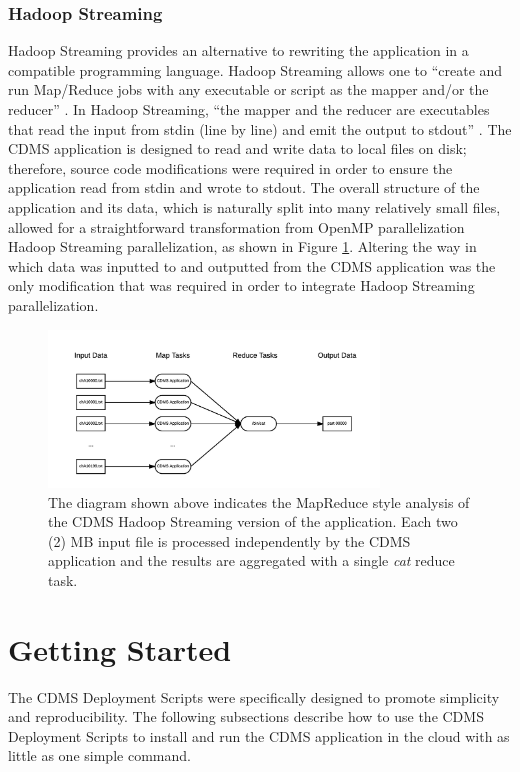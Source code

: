 \documentclass[9pt,twocolumn,twoside]{../../styles/osajnl}
\begin{document}
\subsubsection{Hadoop Streaming}
Hadoop Streaming provides an alternative to rewriting the application
in a compatible programming language. Hadoop Streaming allows one to
``create and run Map/Reduce jobs with any executable or script as the
mapper and/or the reducer'' \cite{www-hadoop-streaming}. In Hadoop
Streaming, ``the mapper and the reducer are executables that read the
input from stdin (line by line) and emit the output to stdout''
\cite{www-hadoop-streaming}. The CDMS application is designed to read
and write data to local files on disk; therefore, source code
modifications were required in order to ensure the application read
from stdin and wrote to stdout. The overall structure of the
application and its data, which is naturally split into many
relatively small files, allowed for a straightforward transformation
from OpenMP parallelization Hadoop Streaming parallelization, as shown
in Figure \ref{fig:hadoop}. Altering the way in which data was
inputted to and outputted from the CDMS application was the only
modification that was required in order to integrate Hadoop Streaming
parallelization.

\begin{figure}[h]
\centering
\includegraphics[height=1.65in, width=\columnwidth]{images/mapreduce}
\caption{The diagram shown above indicates the MapReduce style
  analysis of the CDMS Hadoop Streaming version of the
  application. Each two (2) MB input file is processed independently
  by the CDMS application and the results are aggregated with a single
  \emph{cat} reduce task.}
\label{fig:hadoop}
\end{figure}

\section{Getting Started}
The CDMS Deployment Scripts were specifically designed to promote
simplicity and reproducibility. The following subsections describe how
to use the CDMS Deployment Scripts to install and run the CDMS
application in the cloud with as little as one simple command.
\end{document}
